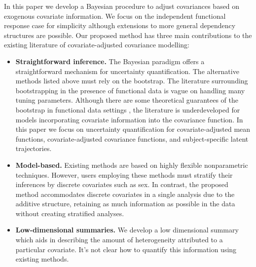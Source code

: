 \documentclass[useAMS,referee,usenatbib]{biom}
\begin{document}
In this paper we develop a Bayesian procedure to adjust covariances based on exogenous covariate information. We focus on the independent functional response case for simplicity although extensions to more general dependency structures are possible. Our proposed method has three main contributions to the existing literature of covariate-adjusted covariance modelling:
\begin{itemize}
	\item \textbf{Straightforward inference.} The Bayesian paradigm offers a straightforward mechanism for uncertainty quantification. The alternative methods listed above must rely on the bootstrap. The literature surrounding bootstrapping in the presence of functional data is vague on handling many tuning parameters. Although there are some theoretical guarantees of the bootstrap in functional data settings \citep{Cuevas2006}, the literature is underdeveloped for models incorporating covariate information into the covariance function. In this paper we focus on uncertainty quantification for covariate-adjusted mean functions, covariate-adjusted covariance functions, and subject-specific latent trajectories.
	\item \textbf{Model-based.} Existing methods are based on highly flexible nonparametric techniques. However, users employing these methods must stratify their inferences by discrete covariates such as sex. In contrast, the proposed method accommodates discrete covariates in a single analysis due to the additive structure, retaining as much information as possible in the data without creating stratified analyses. 
	\item \textbf{Low-dimensional summaries.} We develop a low dimensional summary which aids in describing the amount of heterogeneity attributed to a particular covariate. It's not clear how to quantify this information using existing methods.
\end{itemize}
\end{document}
